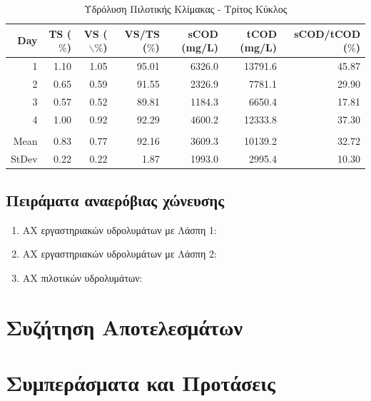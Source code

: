 \documentclass[11pt]{report}
\begin{document}
\begin{table}[htbp]
\caption{\label{tab:org8c2d05f}Υδρόλυση Πιλοτικής Κλίμακας - Τρίτος Κύκλος}
\centering
\begin{tabular}{rrrrrrr}
Day & TS (\(\%\)) & VS ($\backslash$\(\%\)) & VS/TS (\(\%\)) & sCOD (mg/L) & tCOD (mg/L) & sCOD/tCOD (\(\%\))\\[0pt]
\hline
1 & 1.10 & 1.05 & 95.01 & 6326.0 & 13791.6 & 45.87\\[0pt]
2 & 0.65 & 0.59 & 91.55 & 2326.9 & 7781.1 & 29.90\\[0pt]
3 & 0.57 & 0.52 & 89.81 & 1184.3 & 6650.4 & 17.81\\[0pt]
4 & 1.00 & 0.92 & 92.29 & 4600.2 & 12333.8 & 37.30\\[0pt]
 &  &  &  &  &  & \\[0pt]
Mean & 0.83 & 0.77 & 92.16 & 3609.3 & 10139.2 & 32.72\\[0pt]
StDev & 0.22 & 0.22 & 1.87 & 1993.0 & 2995.4 & 10.30\\[0pt]
\end{tabular}
\end{table}

\section{Πειράματα αναερόβιας χώνευσης}
\label{sec:org691a246}

\begin{enumerate}
\item ΑΧ εργαστηριακών υδρολυμάτων με Λάσπη 1:
\label{sec:orga8ac166}

\item ΑΧ εργαστηριακών υδρολυμάτων με Λάσπη 2:
\label{sec:org9a377b4}

\item AX πιλοτικών υδρολυμάτων:
\label{sec:org8807277}
\end{enumerate}

\chapter{Συζήτηση Αποτελεσμάτων}
\label{sec:orga8f9672}
\label{sec:result_discussion}

\chapter{Συμπεράσματα και Προτάσεις}
\label{sec:orge774f90}
\label{sec:conclusion}
\end{document}
